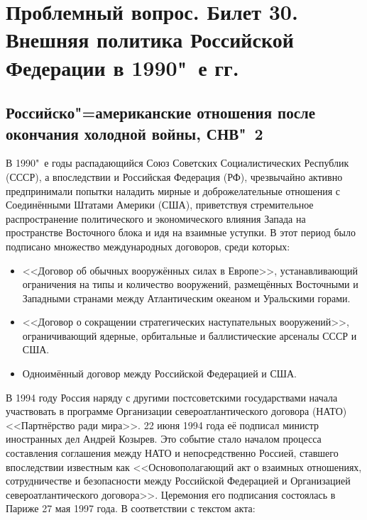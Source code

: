 \section{\textbf{Проблемный вопрос}. Билет 30. Внешняя политика Российской Федерации в 1990"~е гг.}
\subsection{Российско"=американские отношения после окончания холодной войны, СНВ"~2}
В 1990"~е годы распадающийся Союз Советских Социалистических Республик (СССР), а впоследствии и Российская Федерация (РФ), чрезвычайно активно предпринимали попытки наладить мирные и доброжелательные отношения с Соединёнными Штатами Америки (США), приветствуя стремительное распространение политического и экономического влияния Запада на пространстве Восточного блока и идя на взаимные уступки. В этот период было подписано множество международных договоров, среди которых:
\begin{itemize}
    \item <<Договор об обычных вооружённых силах в Европе>>, устанавливающий ограничения на типы и количество вооружений, размещённых Восточными и Западными странами между Атлантическим океаном и Уральскими горами.
    \item <<Договор о сокращении стратегических наступательных вооружений>>, ограничивающий ядерные, орбитальные и баллистические арсеналы СССР и США.
    \item Одноимённый договор между Российской Федерацией и США.
\end{itemize}
В 1994 году Россия наряду с другими постсоветскими государствами начала участвовать в программе Организации североатлантического договора (НАТО) <<Партнёрство ради мира>>. 22 июня 1994 года её подписал министр иностранных дел Андрей Козырев. Это событие стало началом процесса составления соглашения между НАТО и непосредственно Россией, ставшего впоследствии известным как <<Основополагающий акт о взаимных отношениях, сотрудничестве и безопасности между Российской Федерацией и Организацией североатлантического договора>>. Церемония его подписания состоялась в Париже 27 мая 1997 года.
  В соответствии с текстом акта:
